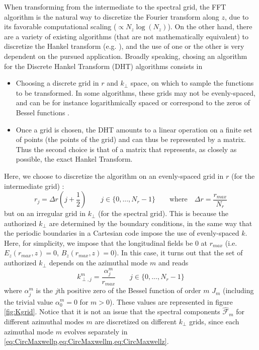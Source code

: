 \documentclass[1p,times,authoryear]{elsarticle}
\newcommand{\spectral}[1]{\hat{\mathcal{#1}}}
\begin{document}
When transforming from the intermediate to the spectral grid, the FFT
algorithm is the natural way to discretize the Fourier transform along $z$, due to its
favorable computational scaling ($\propto N_z\log(N_z)$).
On the other hand, there are a variety of existing algorithms (that are not mathematically
equivalent) to discretize the Hankel
transform (e.g. \citep{Cree,Yu,Siegman,Guizar,KaiMing}), and the use of one or the other
is very dependent on the pursued application. Broadly
speaking, chosing an algorithm for the Discrete Hankel Transform (DHT)
algorithms consists in 
\begin{itemize}
\item Choosing a discrete grid in $r$ and $k_\perp$ space, on which to
  sample the functions to be transformed. In some algorithms, these
  grids may not be evenly-spaced, and can be for instance
  logarithmically spaced \citep{Siegman} or correspond to the zeros of
  Bessel functions \citep{Yu,Guizar,KaiMing}.
\item Once a grid is chosen, the DHT amounts to a linear operation on a
  finite set of points (the points of the grid) and can thus be
  represented by a matrix. Thus the second choice is that of a matrix
  that represents, as closely as possible, the exact Hankel Transform.
\end{itemize}
Here, we choose to discretize the algorithm on an evenly-spaced grid in $r$
(for the intermediate grid) :
\[ r_j = \Delta r \left( j+\frac{1}{2} \right) \qquad  j \in \{0, ...,
N_r-1 \} \qquad \mathrm{where} \quad \Delta r = \frac{r_{max}}{N_r} \]
but on an irregular grid in $k_\perp$ (for the spectral grid). This is because the authorized
$k_\perp$ are determined by the boundary conditions, in the same way that
the periodic boundaries in a Cartesian code impose the use of
evenly-spaced $k$. Here, for simplicity, we impose that the
longitudinal fields be $0$ at $r_{max}$ (i.e. $E_z(r_{max}, z) = 0$,
$B_z(r_{max}, z) = 0$). In this case, it turns out that the set of authorized
$k_\perp$ depends on the azimuthal mode $m$ and reads
\[  k^m_{\perp,j} = \frac{\alpha_j^m}{r_{max}} \qquad j \in \{0, ..., N_r-1 \}\]
where $\alpha^m_j$ is the $j$th positive zero of the Bessel function of order
$m$ $J_m$ (including the trivial value $\alpha_0^m=0$ for
$m>0$). These values are represented in figure \ref{fig:Kgrid}. Notice
that it is not an issue that the spectral components $\spectral{F}_m$
for different azimuthal modes $m$ are discretized on different
$k_\perp$ grids, since each azimuthal mode $m$ evolves separately in
\cref{eq:CircMaxwellp,eq:CircMaxwellm,eq:CircMaxwellz}.
\end{document}
